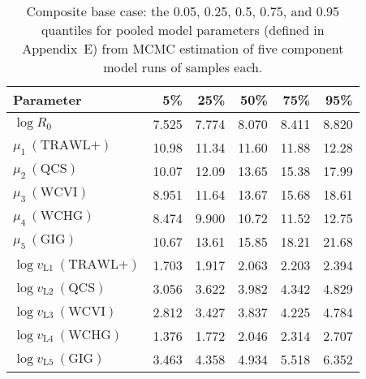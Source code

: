 \documentclass[11pt]{book}
\newcommand{\AppEqn}{Appendix~E}
\begin{document}

\setlength{\tabcolsep}{6pt}
\begin{table}[ht]
\centering
\caption{Composite base case: the 0.05, 0.25, 0.5, 0.75, and 0.95 quantiles for pooled model parameters (defined in \AppEqn) from MCMC estimation of five component model runs of \Nmcmc{} samples each.} 
\label{tab:ymr.base.pars}
\begin{tabular}{lrrrrr}
  \\[-1.0ex] \hline
Parameter & 5\% & 25\% & 50\% & 75\% & 95\% \\ 
  \hline
$\log R_{0}$ & 7.525 & 7.774 & 8.070 & 8.411 & 8.820 \\ 
  $\mu_{1}~(\text{TRAWL+})$ & 10.98 & 11.34 & 11.60 & 11.88 & 12.28 \\ 
  $\mu_{2}~(\text{QCS})$ & 10.07 & 12.09 & 13.65 & 15.38 & 17.99 \\ 
  $\mu_{3}~(\text{WCVI})$ & 8.951 & 11.64 & 13.67 & 15.68 & 18.61 \\ 
  $\mu_{4}~(\text{WCHG})$ & 8.474 & 9.900 & 10.72 & 11.52 & 12.75 \\ 
  $\mu_{5}~(\text{GIG})$ & 10.67 & 13.61 & 15.85 & 18.21 & 21.68 \\ 
  $\log v_{\text{L}1}~(\text{TRAWL+})$ & 1.703 & 1.917 & 2.063 & 2.203 & 2.394 \\ 
  $\log v_{\text{L}2}~(\text{QCS})$ & 3.056 & 3.622 & 3.982 & 4.342 & 4.829 \\ 
  $\log v_{\text{L}3}~(\text{WCVI})$ & 2.812 & 3.427 & 3.837 & 4.225 & 4.784 \\ 
  $\log v_{\text{L}4}~(\text{WCHG})$ & 1.376 & 1.772 & 2.046 & 2.314 & 2.707 \\ 
  $\log v_{\text{L}5}~(\text{GIG})$ & 3.463 & 4.358 & 4.934 & 5.518 & 6.352 \\ 
   \hline
\end{tabular}
\end{table}
\setlength{\tabcolsep}{6pt}
\end{document}
